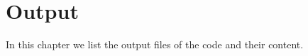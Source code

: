 \chapter{Output}\label{CHAP_OUTPUT}

In this chapter we list the output files of the code and their content.


